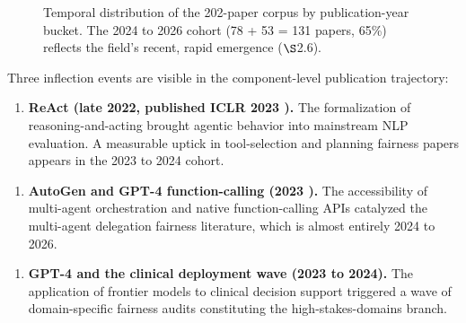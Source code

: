 \documentclass[acmsmall,nonacm]{acmart}
\begin{document}
\begin{figure}[htbp]
\centering
{}
\caption{Temporal distribution of the 202-paper corpus by publication-year bucket. The 2024 to 2026 cohort (78 + 53 = 131 papers, 65\%) reflects the field's recent, rapid emergence ($\S$2.6).}
\label{fig:temporal}
\end{figure}

Three inflection events are visible in the component-level publication trajectory:

\begin{enumerate}
\item \textbf{ReAct (late 2022, published ICLR 2023 \cite{yao2023react}).} The formalization of reasoning-and-acting brought agentic behavior into mainstream NLP evaluation. A measurable uptick in tool-selection and planning fairness papers appears in the 2023 to 2024 cohort.
\end{enumerate}

\begin{enumerate}
\item \textbf{AutoGen and GPT-4 function-calling (2023 \cite{wu2023autogen}).} The accessibility of multi-agent orchestration and native function-calling APIs catalyzed the multi-agent delegation fairness literature, which is almost entirely 2024 to 2026.
\end{enumerate}

\begin{enumerate}
\item \textbf{GPT-4 and the clinical deployment wave (2023 to 2024).} The application of frontier models to clinical decision support \cite{omar2025sociodemographic,poulain2024bias,zack2024coding} triggered a wave of domain-specific fairness audits constituting the high-stakes-domains branch.
\end{enumerate}
\end{document}
